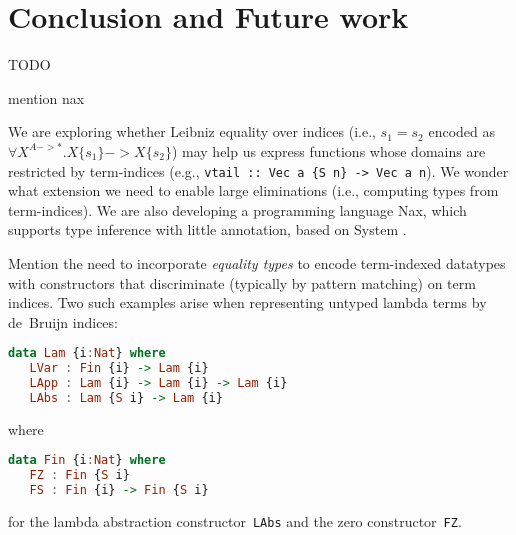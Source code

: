 \section{Conclusion and Future work}
\label{sec:concl}
TODO

mention nax

We are exploring whether Leibniz equality over indices
(i.e., $s_1=s_2$ encoded as $\forall X^{A -> *}.X\{s_1\} -> X\{s_2\}$)
may help us express functions whose domains are restricted by term-indices
(e.g., \verb|vtail :: Vec a {S n} -> Vec a n|). We wonder what extension
we need to enable large eliminations (i.e., computing types from term-indices).
We are also developing a programming language Nax, which supports
type inference with little annotation, based on System \Fi.

Mention the need to incorporate \emph{equality types} to encode
term-indexed datatypes with constructors that discriminate (typically by
pattern matching) on term indices.  Two such examples arise when
representing untyped lambda terms by de~Bruijn indices: 
\begin{lstlisting}[basicstyle={\ttfamily},language=Haskell]
 data Lam {i:Nat} where
   LVar : Fin {i} -> Lam {i}
   LApp : Lam {i} -> Lam {i} -> Lam {i}
   LAbs : Lam {S i} -> Lam {i}
\end{lstlisting}
where 
\begin{lstlisting}[basicstyle={\ttfamily},language=Haskell]
 data Fin {i:Nat} where
   FZ : Fin {S i} 
   FS : Fin {i} -> Fin {S i} 
\end{lstlisting}
for the lambda abstraction constructor~{\tt LAbs} and the zero
constructor~{\tt FZ}.


